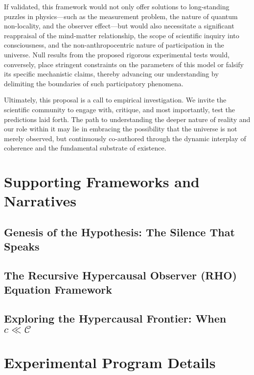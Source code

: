 \documentclass[11pt, a4paper]{book}
\begin{document}
If validated, this framework would not only offer solutions to long-standing puzzles in physics—such as the measurement problem, the nature of quantum non-locality, and the observer effect—but would also necessitate a significant reappraisal of the mind-matter relationship, the scope of scientific inquiry into consciousness, and the non-anthropocentric nature of participation in the universe. Null results from the proposed rigorous experimental tests would, conversely, place stringent constraints on the parameters of this model or falsify its specific mechanistic claims, thereby advancing our understanding by delimiting the boundaries of such participatory phenomena.

Ultimately, this proposal is a call to empirical investigation. We invite the scientific community to engage with, critique, and most importantly, test the predictions laid forth. The path to understanding the deeper nature of reality and our role within it may lie in embracing the possibility that the universe is not merely observed, but continuously co-authored through the dynamic interplay of coherence and the fundamental substrate of existence.

\part{Supporting Frameworks and Narratives}
\label{part:supportingframeworks}
\chapter{Genesis of the Hypothesis: The Silence That Speaks}
\label{chap:silencespeaks}

\chapter{The Recursive Hypercausal Observer (RHO) Equation Framework}
\label{chap:rhoframework}

\chapter{Exploring the Hypercausal Frontier: When $c \ll \mathcal{C}$}
\label{chap:c_ll_C}

\part{Experimental Program Details}
\label{part:experimentalprogram}
\end{document}
